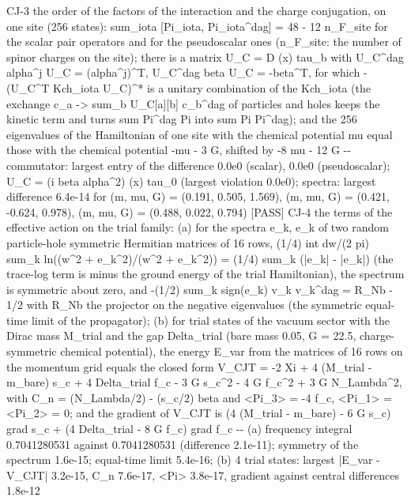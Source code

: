 \documentclass[
  10pt,
]{article}
\newenvironment{Shaded}{}{}
\newcommand{\NormalTok}[1]{#1}
\begin{document}
\begin{Shaded}
\begin{Highlighting}[]
\NormalTok{[PASS] CJ{-}3  the order of the factors of the interaction and the charge conjugation, on one site (256 states): sum\_iota [Pi\_iota, Pi\_iota\^{}dag] = 48 {-} 12 n\_F\_site for the scalar pair operators and for the pseudoscalar ones (n\_F\_site: the number of spinor charges on the site); there is a matrix U\_C = D (x) tau\_b with U\_C\^{}dag alpha\^{}j U\_C = (alpha\^{}j)\^{}T, U\_C\^{}dag beta U\_C = {-}beta\^{}T, for which {-}(U\_C\^{}T Kch\_iota U\_C)\^{}* is a unitary combination of the Kch\_iota (the exchange c\_a {-}\textgreater{} sum\_b U\_C[a][b] c\_b\^{}dag of particles and holes keeps the kinetic term and turns sum Pi\^{}dag Pi into sum Pi Pi\^{}dag); and the 256 eigenvalues of the Hamiltonian of one site with the chemical potential mu equal those with the chemical potential {-}mu {-} 3 G, shifted by {-}8 mu {-} 12 G  {-}{-} commutator: largest entry of the difference 0.0e0 (scalar), 0.0e0 (pseudoscalar); U\_C = (i beta alpha\^{}2) (x) tau\_0 (largest violation 0.0e0); spectra: largest difference 6.4e{-}14 for (m, mu, G) = (0.191, 0.505, 1.569), (m, mu, G) = (0.421, {-}0.624, 0.978), (m, mu, G) = (0.488, 0.022, 0.794)}
\NormalTok{[PASS] CJ{-}4  the terms of the effective action on the trial family: (a) for the spectra e\_k, e\textquotesingle{}\_k of two random particle{-}hole symmetric Hermitian matrices of 16 rows, (1/4) int dw/(2 pi) sum\_k ln((w\^{}2 + e\_k\^{}2)/(w\^{}2 + e\textquotesingle{}\_k\^{}2)) = (1/4) sum\_k (|e\_k| {-} |e\textquotesingle{}\_k|) (the trace{-}log term is minus the ground energy of the trial Hamiltonian), the spectrum is symmetric about zero, and {-}(1/2) sum\_k sign(e\_k) v\_k v\_k\^{}dag = R\_Nb {-} 1/2 with R\_Nb the projector on the negative eigenvalues (the symmetric equal{-}time limit of the propagator); (b) for trial states of the vacuum sector with the Dirac mass M\_trial and the gap Delta\_trial (bare mass 0.05, G = 22.5, charge{-}symmetric chemical potential), the energy E\_var from the matrices of 16 rows on the momentum grid equals the closed form V\_CJT = {-}2 Xi + 4 (M\_trial {-} m\_bare) s\_c + 4 Delta\_trial f\_c {-} 3 G s\_c\^{}2 {-} 4 G f\_c\^{}2 + 3 G N\_Lambda\^{}2, with C\_n = (N\_Lambda/2) {-} (s\_c/2) beta and \textless{}Pi\_3\textgreater{} = {-}4 f\_c, \textless{}Pi\_1\textgreater{} = \textless{}Pi\_2\textgreater{} = 0; and the gradient of V\_CJT is (4 (M\_trial {-} m\_bare) {-} 6 G s\_c) grad s\_c + (4 Delta\_trial {-} 8 G f\_c) grad f\_c  {-}{-} (a) frequency integral 0.7041280531 against 0.7041280531 (difference 2.1e{-}11); symmetry of the spectrum 1.6e{-}15; equal{-}time limit 5.4e{-}16; (b) 4 trial states: largest |E\_var {-} V\_CJT| 3.2e{-}15, C\_n 7.6e{-}17, \textless{}Pi\textgreater{} 3.8e{-}17, gradient against central differences 1.8e{-}12}

\end{Highlighting}
\end{Shaded}
\end{document}
